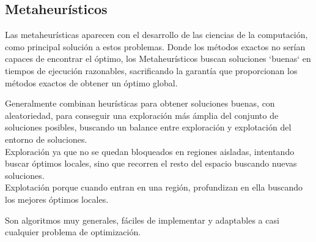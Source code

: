 \documentclass[12pt,a4paper]{book}
\begin{document}
\subsection{Metaheurísticos}
Las metaheurísticas aparecen con el desarrollo de las ciencias de la computación, como principal solución a estos problemas. Donde los métodos exactos no serían capaces de encontrar el óptimo,
los Metaheurísticos buscan soluciones `buenas` en tiempos de ejecución razonables, sacrificando la garantía que proporcionan los métodos exactos de obtener un óptimo global.

Generalmente combinan heurísticas para obtener soluciones buenas, con aleatoriedad, para conseguir una exploración
más ámplia del conjunto de soluciones posibles, buscando un balance entre exploración y explotación del entorno de soluciones.\\
Exploración ya que no se quedan bloqueados en regiones aisladas, intentando buscar óptimos locales, sino que recorren el resto del espacio buscando nuevas soluciones.\\
Explotación porque cuando entran en una región, profundizan en ella buscando los mejores óptimos locales.

Son algoritmos muy generales, fáciles de implementar y adaptables a casi 
cualquier problema de optimización.
\end{document}
